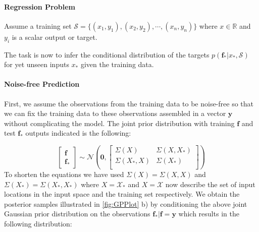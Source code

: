 \paragraph{Regression Problem}
Assume a training set $\mathcal{S} = \{(x_{1},y_{1}), (x_{2},y_{2}), \cdots, (x_{n},y_{n})\}$ where $x \in \mathbb{R}$ and $y_{i}$ is a scalar output or target. 

The task is now to infer the conditional distribution of the targets $p(\textbf{f}_{*}\vert x_{*}, \mathcal{S})$ for yet unseen inputs $x_{*}$ given the training data.  

\paragraph{Noise-free Prediction}
First, we assume the observations from the training data to be noise-free so that we can fix the training data to these observations assembled in a vector $\textbf{y}$ without complicating the model. The joint prior distribution with training $\textbf{f}$ and test $\textbf{f}_{*}$ outputs indicated is the following:

\begin{equation}
\begin{bmatrix}\textbf{f}\\\textbf{f}_{*}\end{bmatrix}
\sim \mathcal{N}\left(\textbf{0},
\begin{bmatrix}
    \Sigma(X) & \Sigma(X,X_{*})\\
    \Sigma(X_{*},X) & \Sigma(X_{*})\\
\end{bmatrix}
\right)
\end{equation}
To shorten the equations we have used $\Sigma(X)=\Sigma(X,X)$ and $\Sigma(X_{*})=\Sigma(X_{*}, X_{*})$ where $X=\mathcal{X}_{*}$ and $X=\mathcal{X}$ now describe the set of input locations in the input space and the training set respectively.
We obtain the posterior samples illustrated in \ref{fig:GPPlot} b) by conditioning the above joint Gaussian prior distribution on the observations $\textbf{f}_{*}\vert\textbf{f}=\textbf{y}$ which results in the following distribution:

